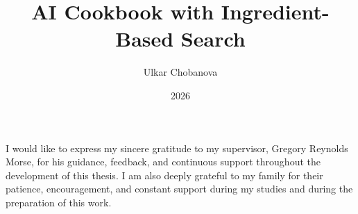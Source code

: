 \documentclass[
]{elteikthesis}[2024/04/26]
\title{ AI Cookbook with Ingredient-Based Search} %
\date{2026} %
\author{Ulkar Chobanova}
\affiliation{Lecturer} %
\begin{document}


\maketitle
%



\chapter*{\acklabel}
I would like to express my sincere gratitude to my supervisor,
Gregory Reynolds Morse, for his guidance, feedback, and continuous
support throughout the development of this thesis. I am also deeply
grateful to my family for their patience, encouragement, and constant
support during my studies and during the preparation of this work.
\cleardoublepage

\tableofcontents
\cleardoublepage


\cleardoublepage


\cleardoublepage


\cleardoublepage


\cleardoublepage


\cleardoublepage


\cleardoublepage

{}
\nocite{http2022rfc9110,json2017rfc8259,jwt2015rfc7519,foodcom2019kaggle,openai2026platform,openai2026api,openai2026images,openai2026embeddings,google2026vision,fastapi2026docs,pydantic2026docs,pydanticsettings2026docs,sqlalchemy2026docs,alembic2026docs,chromadb2026docs,sqlite2026docs,uvicorn2026docs,httpx2026docs,pillow2026docs,pythondotenv2026docs,pythonjose2026docs,passlib2026docs,argon22026docs,pytest2026docs,coveragepy2026docs,react2026docs,reactrouter2026docs,vite2026docs,vitest2026docs,testinglibraryreact2026docs,testinglibraryjestdom2026docs,jsdom2026docs,postman2026docs,python2026docs,node2026docs,npm2026docs,git2026docs,vscode2026docs,chrome2026docs}
\printbibliography[title=\biblabel]
\cleardoublepage
\end{document}
